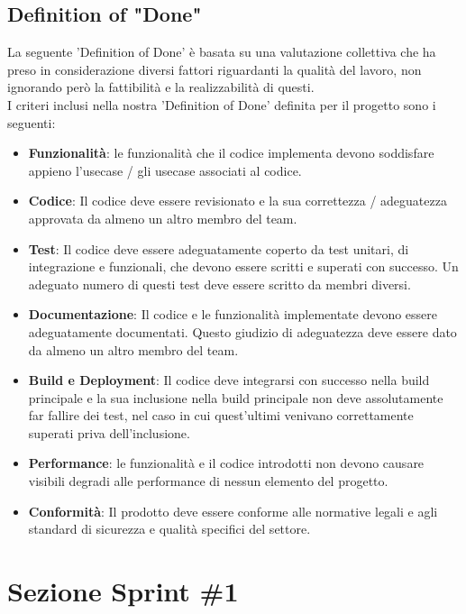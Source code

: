 \documentclass{article}
\begin{document}
\subsection{Definition of "Done"}
La seguente 'Definition of Done' è basata su una valutazione collettiva che ha preso in considerazione  diversi fattori riguardanti la qualità del lavoro, non ignorando però la fattibilità e la realizzabilità di questi.\\
I criteri inclusi nella nostra 'Definition of Done' definita per il progetto sono i seguenti:
\begin{itemize}
	\item \textbf{Funzionalità}: le funzionalità che il codice implementa devono soddisfare appieno l'usecase / gli usecase associati al codice.
    \item \textbf{Codice}: Il codice deve essere revisionato e la sua correttezza / adeguatezza approvata da almeno un altro membro del team.
    \item \textbf{Test}: Il codice deve essere adeguatamente coperto da test unitari, di integrazione e funzionali, che devono essere scritti e superati con successo. Un adeguato numero di questi test deve essere scritto da membri diversi.
    \item \textbf{Documentazione}: Il codice e le funzionalità implementate devono essere adeguatamente documentati. Questo giudizio di adeguatezza deve essere dato da almeno un altro membro del team.
    \item \textbf{Build e Deployment}: Il codice deve integrarsi con successo nella build principale e la sua inclusione nella build principale non deve assolutamente far fallire dei test, nel caso in cui quest'ultimi venivano correttamente superati priva dell'inclusione.
    \item \textbf{Performance}: le funzionalità e il codice introdotti non devono causare visibili degradi alle performance di nessun elemento del progetto.
    \item \textbf{Conformità}: Il prodotto deve essere conforme alle normative legali e agli standard di sicurezza e qualità specifici del settore.
\end{itemize}

\clearpage

\section{Sezione Sprint \#1}
\end{document}
